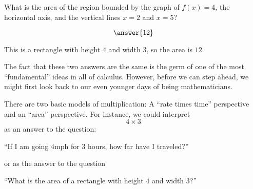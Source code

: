 \documentclass{ximera}
\begin{document}
  \begin{question}
    What is the area of the region bounded by the graph of $f(x) = 4$, the horizontal
    axis, and the vertical lines $x=2$ and $x=5$?
    \begin{prompt}
      \[
      \answer{12}
      \]
    \end{prompt}
    \begin{hint}
      \begin{image}
\end{image}
    \end{hint}
    \begin{hint}
      This is a rectangle with height $4$ and width $3$, so the area is $12$.
    \end{hint}
  \end{question}


The fact that these two answers are the same is the germ of one of the
most ``fundamental'' ideas in all of calculus. However, before we can
step ahead, we might first look back to our even younger days of being mathematicians.

There are two basic models of multiplication: A ``rate times time''
perspective and an ``area'' perspective.  For instance, we could
interpret
\[
4\times 3
\]
as an answer to the question:
\begin{center}
  ``If I am going $4 \textrm{mph}$ for $3$ hours, how far have I
  traveled?''
  \end{center}
or as the answer to the question
\begin{center}
  ``What is the area of a rectangle with height $4$ and width $3$?''
\end{center}
\end{document}
